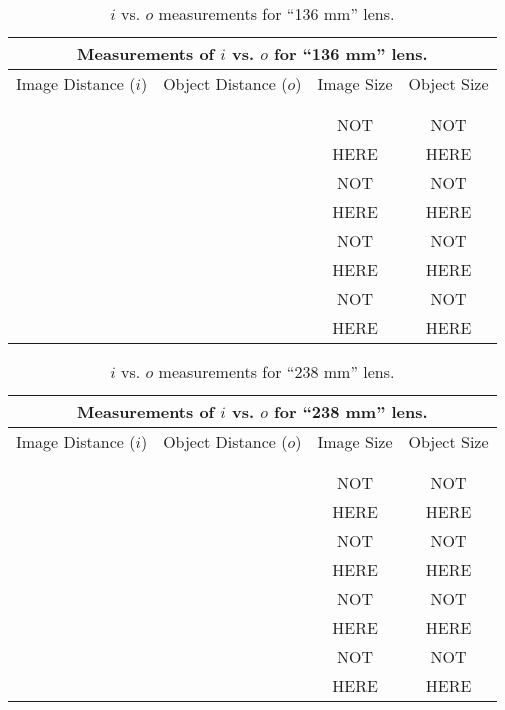 \begin{table}[htb]
\begin{center}
\begin{tabular}{|c|c|c|c|}
\hline
\multicolumn{4}{|c|}{Measurements of $i$ vs. $o$ for ``136 mm'' lens.} \\
\hline
Image Distance ($i$) & Object Distance ($o$) & Image Size & Object Size \\
\hline
\hspace*{3cm} & \hspace*{3cm} & \hspace*{3cm} & \hspace*{3cm} \\
& & &  \\
\hline
& & NOT & NOT  \\
& & HERE& HERE \\
\hline
& & NOT & NOT \\
& & HERE & HERE\\
\hline
& & NOT & NOT \\
& & HERE & HERE \\
\hline
& & NOT & NOT \\
& & HERE & HERE \\
\hline
\end{tabular}
\end{center}
\caption{$i$ vs. $o$ measurements for ``136 mm'' lens.}
\label {tab:OP:136}
\end{table}


\begin{table}[htb]
\begin{center}
\begin{tabular}{|c|c|c|c|}
\hline
\multicolumn{4}{|c|}{Measurements of $i$ vs. $o$ for ``238 mm'' lens.} \\
\hline
Image Distance ($i$) & Object Distance ($o$) & Image Size & Object Size \\
\hline
\hspace*{3cm} & \hspace*{3cm} & \hspace*{3cm} & \hspace*{3cm} \\
& & &  \\
\hline
& & NOT & NOT  \\
& & HERE & HERE \\
\hline
& & NOT & NOT \\
& & HERE & HERE \\
\hline
& & NOT & NOT \\
& & HERE & HERE \\
\hline
& & NOT & NOT \\
& & HERE & HERE \\
\hline
\end{tabular}
\end{center}
\caption{$i$ vs. $o$ measurements for ``238 mm'' lens.}
\label {tab:OP:238}
\end{table}

